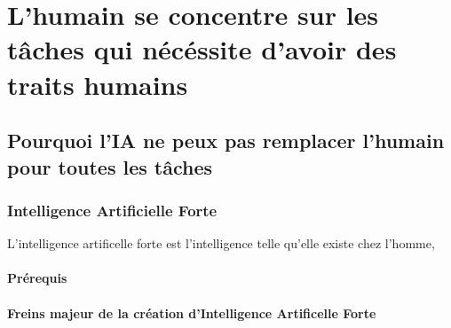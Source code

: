 \part{L'humain se concentre sur les tâches qui nécéssite d'avoir des traits humains}
\chapter{Pourquoi l'IA ne peux pas remplacer l'humain pour toutes les tâches}
\section{Intelligence Artificielle Forte}
L'intelligence artificelle forte est l'intelligence
telle qu'elle existe chez l'homme, 

\subsection{Prérequis}
\subsection{Freins majeur de la création d'Intelligence Artificelle Forte}